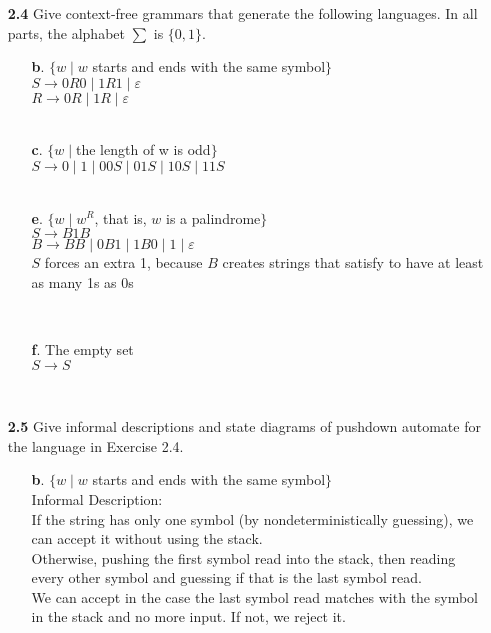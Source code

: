 \documentclass[12pt]{letter}
\begin{document}
\begin{enumerate}
\ \\ %
\item[\textbf{2.4}]Give context-free grammars that generate the following languages. In all parts, the alphabet  $\sum$ is $\{0,1\}$.
\begin{enumerate}
	\item[\textbf{b}.] $\{ w \mid w$ starts and ends with the same symbol$\}$
	\leavevmode \\
	$S \rightarrow 0R0 \mid 1R1 \mid \varepsilon$ \\
	$R \rightarrow 0R \mid 1R \mid \varepsilon$ \\

	\leavevmode \\
	\item[\textbf{c}.] $\{ w \mid $the length of w is odd$\}$
	\leavevmode \\
	$S \rightarrow 0 \mid 1 \mid 00S \mid 01S \mid 10S \mid 11S$ \\

	\leavevmode \\
	\item[\textbf{e}.] $\{ w \mid w^R$, that is, $w$ is a palindrome$\}$
	\leavevmode \\
	$S \rightarrow B1B$ \\
	$B \rightarrow BB \mid 0B1 \mid 1B0 \mid 1 \mid \varepsilon$ \\
	$S$ forces an extra 1, because $B$ creates strings that satisfy to have at least as many 1s as 0s

	\leavevmode \\
	\item[\textbf{f}.] The empty set
	\leavevmode \\
	$S \rightarrow S$ \\

\end{enumerate}

\ \\ %
\item[\textbf{2.5}] Give informal descriptions and state diagrams of pushdown automate for the language in Exercise 2.4.
\begin{enumerate}
	\item[\textbf{b}.] $\{ w \mid w$ starts and ends with the same symbol$\}$
	\leavevmode \\
	Informal Description: \\
	If the string has only one symbol (by nondeterministically guessing), we can accept it without using the stack.\\
	Otherwise, pushing the first symbol read into the stack, then reading every other symbol and guessing if that is the last symbol read. \\
	We can accept in the case the last symbol read matches with the symbol in the stack and no more input. If not, we reject it.


\end{enumerate}
\end{enumerate}
\end{document}
